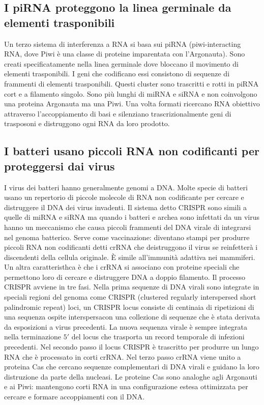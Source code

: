 \subsection{I piRNA proteggono la linea germinale da elementi trasponibili}
Un terzo sistema di interferenza a RNA si basa sui piRNA (piwi-interacting RNA, dove Piwi \`e una classe di proteine imparentata con l'Argonauta). Sono creati specificatamente nella
linea germinale dove bloccano il movimento di elementi trasponibili. I geni che codificano essi consistono di sequenze di frammenti di elementi trasponibili. Questi cluster sono 
trascritti e rotti in piRNA cort e a filamento singolo. Sono pi\`u lunghi di miRNA e siRNA e non coinvolgono una proteina Argonauta ma una Piwi. Una volta formati ricercano RNA obiettivo
attraverso l'accoppiamento di basi e silenziano trascrizionalmente geni di trasposoni e distruggono ogni RNA da loro prodotto. 
\subsection{I batteri usano piccoli RNA non codificanti per proteggersi dai virus}
I virus dei batteri hanno generalmente genomi a DNA. Molte specie di batteri usano un repertorio di piccole molecole di RNA non codificante per cercare e distruggere il DNA dei virus
invadenti. Il sistema detto CRISPR sono simili a quelle di miRNA e siRNA ma quando i batteri e archea sono infettati da un virus hanno un meccanismo che causa piccoli frammenti del
DNA virale di integrarsi nel genoma batterico. Serve come vaccinazione: diventano stampi per produrre piccoli RNA non codificanti detti crRNA che deistruggono il virus se reinfetter\`a
i discendenti della cellula originale. \`E simile all'immunit\`a adattiva nei mammiferi. Un altra caratteristhca \`e che i crRNA si associano con proteine speciali che permettono loro di
cercare e distruggere DNA a doppio filamento. Il processo CRISPR avviene in tre fasi. Nella prima sequenze di DNA virali sono integrate in speciali regioni del genoma come CRISPR
(clustered regularly interspersed short palindromic repeat) loci, un CRISPR locus consiste di centinaia di ripetizioni di una sequenza ospite interspersacon una collezione di sequenze
che \`e stata derivata da esposizioni a virus precedenti. La nuova sequenza virale \`e sempre integrata nella terminazione $5'$ del locus che trasporta un record temporale di 
infezioni precedenti. Nel secondo passo il locus CRISPR \`e trascritto per produrre un lungo RNA che \`e processato in corti crRNA. Nel terzo passo crRNA viene unito a proteina Cas che
cercano sequenze complementari di DNA virali e guidano la loro distruzione da parte della nucleasi. Le proteine Cas sono analoghe agli Argonauti e ai Piwi: mantengono corti RNA in 
una configurazione estesa ottimizzata per cercare e formare accoppiamenti con il DNA. 
